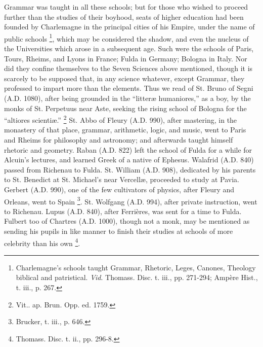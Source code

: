 Grammar was taught in all these schools; but for those who wished
to proceed further than the studies of their boyhood, seats of higher
education had been founded by Charlemagne in the principal cities of
his Empire, under the name of public schools \footnote{Charlemagne's
schools taught Grammar, Rhetoric, Leges, Canones, Theology biblical
and patristical. \emph{Vid}. Thomass. Disc. t. iii., pp. 271-294;
Ampère Hist., t. iii., p. 267.}, which may be considered the shadow, and even the nucleus of
the Universities which arose in a subsequent age. Such were the
schools of Paris, Tours, Rheims, and Lyons in France; Fulda in
Germany; Bologna in Italy. Nor did they confine themselves to the
Seven Sciences above mentioned, though it is scarcely to be supposed
that, in any science whatever, except Grammar, they professed to
impart more than the elements. Thus we read of St. Bruno of Segni (A.D.
1080), after being grounded in the ``litteræ humaniores,'' as
a boy, by the monks of St. Perpetuus near Aste, seeking the rising
school of Bologna for the ``altiores scientiæ.'' \footnote{Vit.. ap.
Brun. Opp. ed. 1759.} St. Abbo of Fleury (A.D. 990), after
mastering, in the monastery of that place, grammar, arithmetic,
logic, and music, went to Paris and Rheims for philosophy and
astronomy; and afterwards taught himself rhetoric and geometry. Raban
(A.D. 822) left the school of Fulda for a while
for Alcuin's lectures, and learned Greek of a native of Ephesus.
Walafrid (A.D. 840) passed from Richenau to
Fulda. St. William (A.D. 908), dedicated by his
parents to St. Benedict at St. Michael's near Vercellæ, proceeded to
study at Pavia. Gerbert (A.D. 990), one of the
few cultivators of physics, after Fleury and Orleans, went to Spain \footnote{Brucker, t.
iii., p. 646.}. St. Wolfgang (A.D. 994), after private
instruction, went to Richenau. Lupus (A.D. 840),
after Ferrières, was sent for a time to Fulda. Fulbert too of
Chartres (A.D. 1000), though not a monk, may be
mentioned as sending his pupils in like manner to finish their studies
at schools of more celebrity than his own \footnote{Thomass.
Disc. t. ii., pp. 296-8.}.

